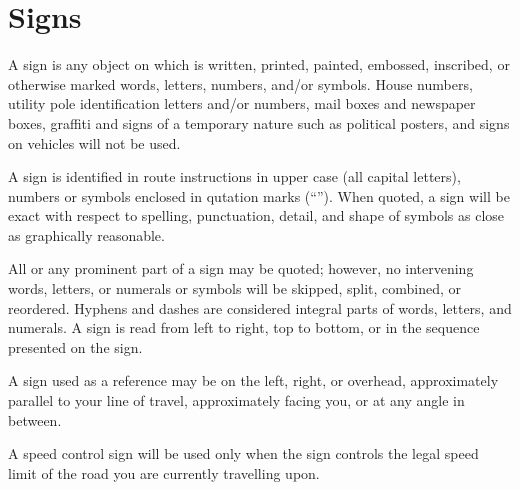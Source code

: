\section{Signs}

\hiddensubsection{}
A sign is any object on which is written, printed, painted, embossed, inscribed, or otherwise marked words, letters, numbers, and/or symbols.  House numbers, utility pole identification letters and/or numbers, mail boxes and newspaper boxes, graffiti and signs of a temporary nature such as political posters, and signs on vehicles will not be used.

\hiddensubsection{}
A sign is identified in route instructions in upper case (all capital letters), numbers or symbols enclosed in qutation marks (``'').  When quoted, a sign will be exact with respect to spelling, punctuation, detail, and shape of symbols as close as graphically reasonable.

\hiddensubsection{}
All or any prominent part of a sign may be quoted; however, no intervening words, letters, or numerals or symbols will be skipped, split, combined, or reordered.  Hyphens and dashes are considered integral parts of words, letters, and numerals.  A sign is read from left to right, top to bottom, or in the sequence presented on the sign.

\hiddensubsection{}
A sign used as a reference may be on the left, right, or overhead, approximately parallel to your line of travel, approximately facing you, or at any angle in between.

\hiddensubsection{}
A speed control sign will be used only when the sign controls the legal speed limit of the road you are currently travelling upon.
